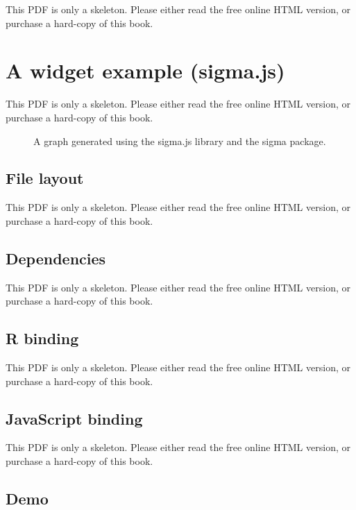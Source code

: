\documentclass[
  11pt,
]{krantz}
\theoremstyle{definition}
\theoremstyle{definition}
\theoremstyle{definition}
\theoremstyle{definition}
\theoremstyle{remark}
\begin{document}
This PDF is only a skeleton. Please either read the free online HTML version, or purchase a hard-copy of this book.

\section{A widget example (sigma.js)}\label{htmlwidgets-sigma}

This PDF is only a skeleton. Please either read the free online HTML version, or purchase a hard-copy of this book.

\begin{figure}\caption{A graph generated using the sigma.js library and the sigma package.}\end{figure}

\subsection{File layout}\label{file-layout}

This PDF is only a skeleton. Please either read the free online HTML version, or purchase a hard-copy of this book.

\subsection{Dependencies}\label{dependencies}

This PDF is only a skeleton. Please either read the free online HTML version, or purchase a hard-copy of this book.

\subsection{R binding}\label{r-binding}

This PDF is only a skeleton. Please either read the free online HTML version, or purchase a hard-copy of this book.

\subsection{JavaScript binding}\label{javascript-binding}

This PDF is only a skeleton. Please either read the free online HTML version, or purchase a hard-copy of this book.

\subsection{Demo}\label{demo}
\end{document}
